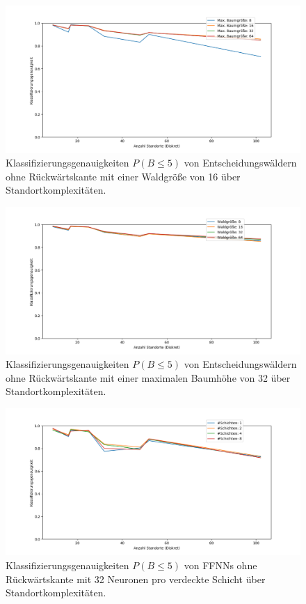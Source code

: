 \begin{figure}[h!]
    \centering
    \includegraphics[width=\linewidth]{images/multiple_best_by_group_dt_max_depth_acc_5.png}
    \caption{Klassifizierungsgenauigkeiten $P(B\leq5)$ von Entscheidungswäldern ohne Rückwärtskante mit einer Waldgröße von 16 über Standortkomplexitäten.}
    \label{fig:multiple_best_by_group_dt_max_depth_acc_5}
\end{figure}

\begin{figure}[h!]
    \centering
    \includegraphics[width=\linewidth]{images/multiple_best_by_group_dt_trees_acc_5.png}
    \caption{Klassifizierungsgenauigkeiten $P(B\leq5)$ von Entscheidungswäldern ohne Rückwärtskante mit einer maximalen Baumhöhe von 32 über Standortkomplexitäten.}
    \label{fig:multiple_best_by_group_dt_trees_acc_5}
\end{figure}

\begin{figure}[h!]
    \centering
    \includegraphics[width=\linewidth]{images/multiple_best_by_group_knn_layers_acc_5.png}
    \caption{Klassifizierungsgenauigkeiten $P(B\leq5)$ von FFNNs ohne Rückwärtskante mit 32 Neuronen pro verdeckte Schicht über Standortkomplexitäten.}
    \label{fig:multiple_best_by_group_knn_layers_acc_5}
\end{figure}

